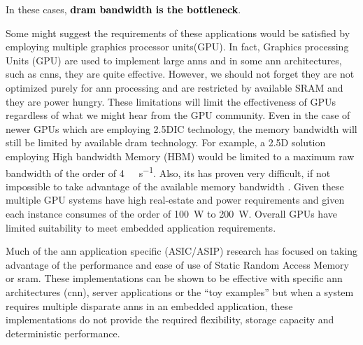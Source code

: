 In these cases, \textbf{\textcolor{black}{\ac{dram} bandwidth is the bottleneck}}.
\fi



\iffalse
So considering the performance improvements observed in other applications, it is expected that many customer facing or embedded applications will implement multiple instances of artificial neural networks to perform various functions.
have very large memory and processing requirements.
require multiple instances of \ac{ann}s of similar size to the \ac{ann} described in \cite{krizhevsky2012imagenet}.

For example employing multiple cameras or monitoring and controlling different systems in a drone, a automobile each with an image recognition \ac{ann}\cite{krizhevsky2012imagenet}\cite{bojarski2016end} for navigation, engine monitoring along with other system control.
\fi

\iffalse
Some might suggest the requirements of these applications would be satisfied by employing multiple graphics processor units(GPU).
In fact, Graphics processing Units (GPU) are used to implement large \ac{ann}s and in some \ac{ann} architectures, such as \acp{cnn}, they are quite effective. However, we should not forget they are not optimized purely for \ac{ann} processing and are restricted by available SRAM and they are power hungry. These limitations will limit the effectiveness of GPUs regardless of what we might hear from the GPU community.
Even in the case of newer GPUs which are employing 2.5DIC technology, the memory bandwidth will still be limited by available \ac{dram} technology.
For example, a 2.5D solution employing High bandwidth Memory (HBM) would be limited to a maximum raw bandwidth of the order of \SI[per-mode=symbol]{4}{\tera \bit \per \second}.
Also, its has proven very difficult, if not impossible to take advantage of the available memory bandwidth \cite{farabet2011neuflow} \cite{jouppi2017datacenter}.
Given these multiple GPU systems have high real-estate and power requirements and given each instance consumes of the order of \SI{100}{\watt} to \SI{200}{\watt}.
Overall GPUs have limited suitability to meet embedded application requirements.


Much of the \ac{ann} application specific (ASIC/ASIP) research has focused on taking advantage of the performance and ease of use of Static Random Access Memory or \ac{sram}. 
These implementations can be shown to be effective with specific \ac{ann} architectures (\ac{cnn}), server applications or the ``toy examples'' but when a system requires multiple disparate \ac{ann}s in an embedded application, these implementations do not provide the required flexibility, storage capacity and deterministic performance.

